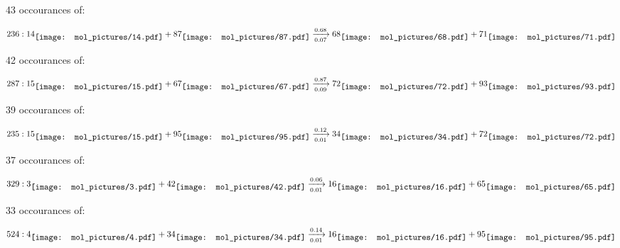 \documentclass{article}
\begin{document}
\vspace{1cm}


43 occourances of:

$$
236:  
14
\raisebox{-.5\height}{\texttt{[image: mol\_pictures/14.pdf]}}
+
87
\raisebox{-.5\height}{\texttt{[image: mol\_pictures/87.pdf]}}
\xrightarrow[0.07]{0.68}
68
\raisebox{-.5\height}{\texttt{[image: mol\_pictures/68.pdf]}}
+
71
\raisebox{-.5\height}{\texttt{[image: mol\_pictures/71.pdf]}}
$$



\vspace{1cm}


42 occourances of:

$$
287:  
15
\raisebox{-.5\height}{\texttt{[image: mol\_pictures/15.pdf]}}
+
67
\raisebox{-.5\height}{\texttt{[image: mol\_pictures/67.pdf]}}
\xrightarrow[0.09]{0.87}
72
\raisebox{-.5\height}{\texttt{[image: mol\_pictures/72.pdf]}}
+
93
\raisebox{-.5\height}{\texttt{[image: mol\_pictures/93.pdf]}}
$$



\vspace{1cm}


39 occourances of:

$$
235:  
15
\raisebox{-.5\height}{\texttt{[image: mol\_pictures/15.pdf]}}
+
95
\raisebox{-.5\height}{\texttt{[image: mol\_pictures/95.pdf]}}
\xrightarrow[0.01]{0.12}
34
\raisebox{-.5\height}{\texttt{[image: mol\_pictures/34.pdf]}}
+
72
\raisebox{-.5\height}{\texttt{[image: mol\_pictures/72.pdf]}}
$$



\vspace{1cm}


37 occourances of:

$$
329:  
3
\raisebox{-.5\height}{\texttt{[image: mol\_pictures/3.pdf]}}
+
42
\raisebox{-.5\height}{\texttt{[image: mol\_pictures/42.pdf]}}
\xrightarrow[0.01]{0.06}
16
\raisebox{-.5\height}{\texttt{[image: mol\_pictures/16.pdf]}}
+
65
\raisebox{-.5\height}{\texttt{[image: mol\_pictures/65.pdf]}}
$$



\vspace{1cm}


33 occourances of:

$$
524:  
4
\raisebox{-.5\height}{\texttt{[image: mol\_pictures/4.pdf]}}
+
34
\raisebox{-.5\height}{\texttt{[image: mol\_pictures/34.pdf]}}
\xrightarrow[0.01]{0.14}
16
\raisebox{-.5\height}{\texttt{[image: mol\_pictures/16.pdf]}}
+
95
\raisebox{-.5\height}{\texttt{[image: mol\_pictures/95.pdf]}}
$$
\end{document}
